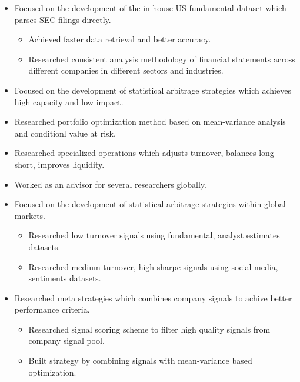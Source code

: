 \documentclass[11pt,a4paper,sans]{moderncv}        %
\begin{document}
{\begin{itemize}%
    \item Focused on the development of the in-house US fundamental dataset which parses SEC filings directly.
        \begin{itemize}%
            \item Achieved faster data retrieval and better accuracy.
            \item Researched consistent analysis methodology of financial statements across different companies in different sectors and industries.
        \end{itemize}
\end{itemize}}

{\begin{itemize}%
    \item Focused on the development of statistical arbitrage strategies which achieves high capacity and low impact.
    \item Researched portfolio optimization method based on mean-variance analysis and conditionl value at risk.
    \item Researched specialized operations which adjusts turnover, balances long-short, improves liquidity.
    \item Worked as an advisor for several researchers globally.
\end{itemize}}

{\begin{itemize}%
    \item Focused on the development of statistical arbitrage strategies within global markets.
        \begin{itemize}%
            \item Researched low turnover signals using fundamental, analyst estimates datasets.
            \item Researched medium turnover, high sharpe signals using social media, sentiments datasets.
        \end{itemize}
    \item Researched meta strategies which combines company signals to achive better performance criteria.
        \begin{itemize}%
            \item Researched signal scoring scheme to filter high quality signals from company signal pool.
            \item Built strategy by combining signals with mean-variance based optimization.
        \end{itemize}
\end{itemize}}
\end{document}
